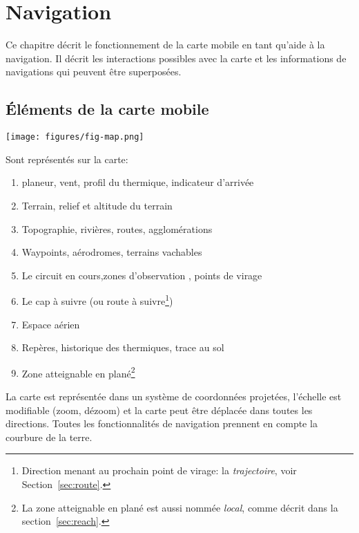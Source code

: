\chapter{Navigation}\label{cha:navigation}
Ce chapitre décrit le fonctionnement de la carte mobile en tant qu'aide à la navigation.
Il décrit  les interactions possibles avec la carte et les informations de navigations qui peuvent être superposées.

\section{Éléments de la carte mobile}

\begin{maxipage}
\texttt{[image: figures/fig-map.png]}
\end{maxipage}

Sont représentés sur la carte:
\begin{enumerate} 
\item planeur, vent, profil du thermique, indicateur d'arrivée
\item Terrain, relief et altitude du terrain
\item Topographie, rivières, routes, agglomérations
\item Waypoints, aérodromes, terrains vachables 
\item Le circuit en cours,zones d'observation , points de virage
\item Le cap à suivre (ou route à suivre\footnote{Direction menant au prochain point de virage: la  {\em trajectoire}, voir Section~\ref{sec:route}.}) 
\item Espace aérien
\item Repères, historique des thermiques, trace au sol
\item Zone atteignable en plané\footnote{La zone atteignable en plané est aussi nommée {\em local}, comme décrit dans la  section~\ref{sec:reach}.}
\end{enumerate}
La carte est représentée dans un système de coordonnées projetées, l'échelle est modifiable (zoom, dézoom) et la carte peut être déplacée dans toutes les directions. Toutes les fonctionnalités de navigation prennent en compte la courbure de la terre.

